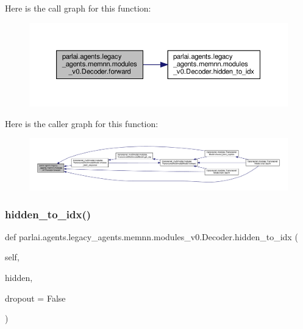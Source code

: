 Here is the call graph for this function\+:
\nopagebreak
\begin{figure}[H]
\begin{center}
\leavevmode
\includegraphics[width=350pt]{classparlai_1_1agents_1_1legacy__agents_1_1memnn_1_1modules__v0_1_1Decoder_a1da4529bbaf122064ff7109fd88cd12a_cgraph}
\end{center}
\end{figure}
Here is the caller graph for this function\+:
\nopagebreak
\begin{figure}[H]
\begin{center}
\leavevmode
\includegraphics[width=350pt]{classparlai_1_1agents_1_1legacy__agents_1_1memnn_1_1modules__v0_1_1Decoder_a1da4529bbaf122064ff7109fd88cd12a_icgraph}
\end{center}
\end{figure}
\mbox{\label{classparlai_1_1agents_1_1legacy__agents_1_1memnn_1_1modules__v0_1_1Decoder_aafa684988d164a4ec2cfdb141e1ea31e}} 
\subsubsection{\texorpdfstring{hidden\+\_\+to\+\_\+idx()}{hidden\_to\_idx()}}
{\footnotesize\ttfamily def parlai.\+agents.\+legacy\+\_\+agents.\+memnn.\+modules\+\_\+v0.\+Decoder.\+hidden\+\_\+to\+\_\+idx (\begin{DoxyParamCaption}\item[{}]{self,  }\item[{}]{hidden,  }\item[{}]{dropout = {\ttfamily False} }\end{DoxyParamCaption})}

